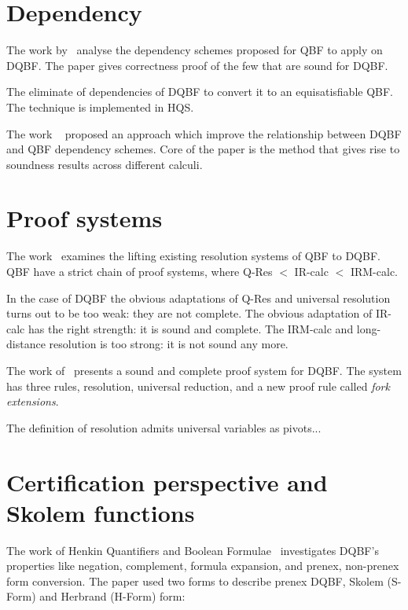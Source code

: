 \documentclass[runningheads]{llncs}
\begin{document}
\section{Dependency}
The work by~\cite{wimmer2016dependency} analyse the dependency
schemes proposed for QBF to apply on DQBF. 
%
The paper gives correctness proof of the few that are sound for DQBF. 
%

The \cite{wimmer2017dqbf} eliminate of dependencies of DQBF to convert it to an equisatisfiable QBF.
%
The technique is implemented in HQS.



The work ~\cite{beyersdorff2018reinterpreting} proposed an approach which improve the relationship between DQBF and QBF
dependency schemes.
%
Core of the paper is the method that gives rise to soundness results across different calculi.

\section{Proof systems}
The work~\cite{beyersdorff2016lifting} examines the lifting existing resolution systems of QBF to DQBF.
%
QBF have a strict chain of proof systems, where Q-Res $<$ IR-calc $<$ IRM-calc.
%

In the case of DQBF the obvious adaptations of Q-Res and universal resolution turns out to be too weak: they are not complete. 
%
The obvious adaptation of IR-calc has
the right strength: it is sound and complete. 
%
The IRM-calc and long-distance resolution is too strong: it is not sound any more.

The work of~\cite{rabe2017resolution} presents a sound and complete proof system for DQBF.
%
The system has three rules, resolution, universal reduction, and a new proof rule called \textit{fork extensions}.

The definition of resolution admits universal variables as pivots...

\section{Certification perspective and Skolem functions}

The work of Henkin Quantifiers and Boolean Formulae~\cite{balabanov2012henkin} investigates DQBF's properties like negation, complement, formula expansion, and prenex, non-prenex form conversion. 
%
The paper used two forms to describe prenex DQBF, Skolem (S-Form) and Herbrand (H-Form) form:
\end{document}
